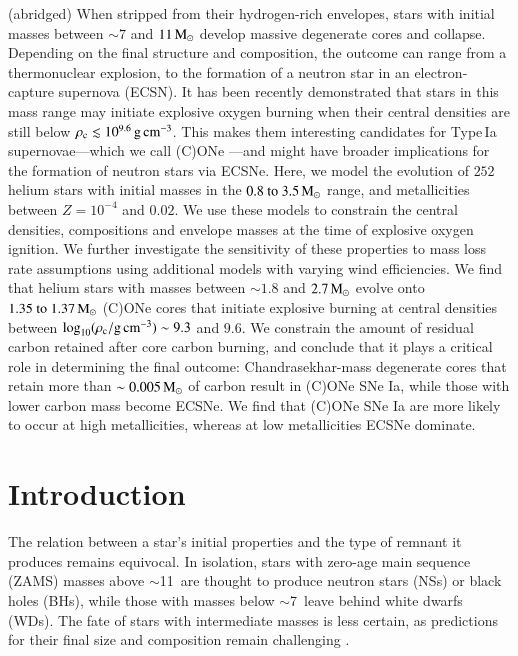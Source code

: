 \documentclass[main.tex]{subfiles}
\begin{document}
    (abridged) When stripped from their hydrogen-rich envelopes, stars with initial masses between $\sim 7$ and $11\mathrm{\,M_\odot}$ develop massive degenerate cores and collapse. Depending on the final structure and composition, the outcome can range from a thermonuclear explosion, to the formation of a neutron star in an electron-capture supernova (ECSN). It has been recently demonstrated that stars in this mass range may initiate explosive oxygen burning when their central densities are still below $\rho_{\mathrm{c}} \lesssim 10^{9.6}\mathrm{\,g\,cm^{-3}}$. This makes them interesting candidates for Type\,Ia supernovae---which we call (C)ONe \ias---and might have broader implications for the formation of neutron stars via ECSNe. Here, we model the evolution of $252$ helium stars with initial masses in the $\numrange{0.8}{3.5}\msun$ range, and metallicities between $Z=10^{-4}$ and $0.02$. We use these models to constrain the central densities, compositions and envelope masses at the time of explosive oxygen ignition. We further investigate the sensitivity of these properties to mass loss rate assumptions using additional models with varying wind efficiencies. We find that helium stars with masses between $\sim1.8$ and $2.7\mathrm{\,M_\odot}$ evolve onto $\numrange{1.35}{1.37}\msun$ (C)ONe cores that initiate explosive burning at central densities between $\log_{10} (\rho_{\mathrm{c}}/ \mathrm{g\,cm^{-3}}) \sim 9.3$ and $9.6$. We constrain the amount of residual carbon retained after core carbon burning, and conclude that it plays a critical role in determining the final outcome: Chandrasekhar-mass degenerate cores that retain more than $\sim 0.005\mathrm{\,M_\odot}$ of carbon result in (C)ONe SNe Ia, while those with lower carbon mass become ECSNe. We find that (C)ONe SNe Ia are more likely to occur at high metallicities, whereas at low metallicities ECSNe dominate.
    
    {
        \minitoc
        \newpage
    }
    
    
\section{Introduction} \label{sec:intro}

The relation between a star's initial properties and the type of remnant it produces remains equivocal.  In isolation, stars with zero-age main sequence 
(ZAMS)  masses above $\sim $11\msun\ are  thought to produce 
neutron stars (NSs) or black holes (BHs), while those with 
masses below $\sim$7\msun\ leave behind white dwarfs (WDs). The 
fate of stars with intermediate masses is less certain, as 
predictions for their final size and composition remain  
challenging \citep[][and references therein]{dec07:siess, Poelarends:2007ip, doherty2015, Farmer:2015afs}. 
\end{document}
